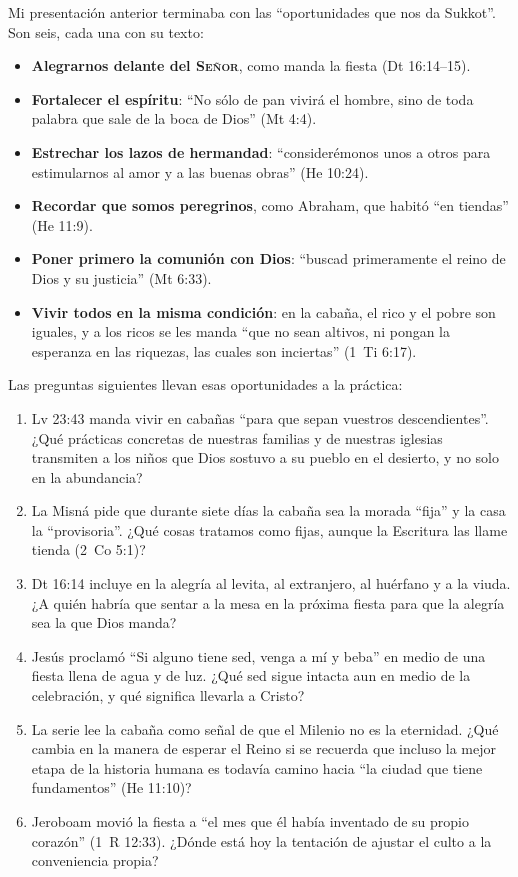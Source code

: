 \documentclass[11pt,letterpaper]{article}
\newcommand{\SENOR}{\textsc{Señor}}
\begin{document}
Mi presentación anterior terminaba con las ``oportunidades que nos da Sukkot''. Son seis, cada una con su texto:
\begin{itemize}
\item \textbf{Alegrarnos delante del \SENOR}, como manda la fiesta (Dt 16:14--15).
\item \textbf{Fortalecer el espíritu}: ``No sólo de pan vivirá el hombre, sino de toda palabra que sale de la boca de Dios'' (Mt 4:4).
\item \textbf{Estrechar los lazos de hermandad}: ``considerémonos unos a otros para estimularnos al amor y a las buenas obras'' (He 10:24).
\item \textbf{Recordar que somos peregrinos}, como Abraham, que habitó ``en tiendas'' (He 11:9).
\item \textbf{Poner primero la comunión con Dios}: ``buscad primeramente el reino de Dios y su justicia'' (Mt 6:33).
\item \textbf{Vivir todos en la misma condición}: en la cabaña, el rico y el pobre son iguales, y a los ricos se les manda ``que no sean altivos, ni pongan la esperanza en las riquezas, las cuales son inciertas'' (1~Ti 6:17).
\end{itemize}

Las preguntas siguientes llevan esas oportunidades a la práctica:

\begin{enumerate}
\item Lv 23:43 manda vivir en cabañas ``para que sepan vuestros descendientes''. ¿Qué prácticas concretas de nuestras familias y de nuestras iglesias transmiten a los niños que Dios sostuvo a su pueblo en el desierto, y no solo en la abundancia?
\item La Misná pide que durante siete días la cabaña sea la morada ``fija'' y la casa la ``provisoria''. ¿Qué cosas tratamos como fijas, aunque la Escritura las llame tienda (2~Co 5:1)?
\item Dt 16:14 incluye en la alegría al levita, al extranjero, al huérfano y a la viuda. ¿A quién habría que sentar a la mesa en la próxima fiesta para que la alegría sea la que Dios manda?
\item Jesús proclamó ``Si alguno tiene sed, venga a mí y beba'' en medio de una fiesta llena de agua y de luz. ¿Qué sed sigue intacta aun en medio de la celebración, y qué significa llevarla a Cristo?
\item La serie lee la cabaña como señal de que el Milenio no es la eternidad. ¿Qué cambia en la manera de esperar el Reino si se recuerda que incluso la mejor etapa de la historia humana es todavía camino hacia ``la ciudad que tiene fundamentos'' (He 11:10)?
\item Jeroboam movió la fiesta a ``el mes que él había inventado de su propio corazón'' (1~R 12:33). ¿Dónde está hoy la tentación de ajustar el culto a la conveniencia propia?
\end{enumerate}
\end{document}
